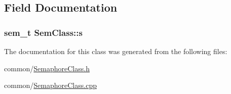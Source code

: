 \subsection{\-Field \-Documentation}
\hypertarget{classSemClass_a03e8d1cad1b13ab754352443cfe09d48}{
\subsubsection[{s}]{\setlength{\rightskip}{0pt plus 5cm}sem\-\_\-t {\bf \-Sem\-Class\-::s}}}\label{classSemClass_a03e8d1cad1b13ab754352443cfe09d48}


\-The documentation for this class was generated from the following files\-:\begin{DoxyCompactItemize}
\item 
common/\hyperlink{SemaphoreClass_8h}{\-Semaphore\-Class.\-h}\item 
common/\hyperlink{SemaphoreClass_8cpp}{\-Semaphore\-Class.\-cpp}\end{DoxyCompactItemize}
